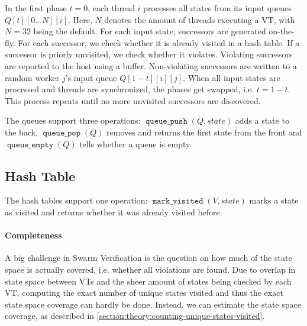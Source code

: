 \documentclass[
fancyheadings, %
%
%
]{stsreprt}
\DeclareMathOperator{\markVisited}{\texttt{mark\_visited}}
\DeclareMathOperator{\qEmpty}{\texttt{queue\_empty}}
\DeclareMathOperator{\qPop}{\texttt{queue\_pop}}
\DeclareMathOperator{\qPush}{\texttt{queue\_push}}
\begin{document}
In the first phase $t=0$, each thread $i$ processes all states from its input queues $Q\left[t\right]\left[ 0 \dots N \right]\left[i\right]$.
Here, $N$ denotes the amount of threads executing a VT, with $N=32$ being the default.
For each input state, successors are generated on-the-fly.
For each successor, we check whether it is already visited in a hash table.
If a successor is priorly unvisited, we check whether it violates.
Violating successors are reported to the host using a buffer.
Non-violating successors are written to a random worker $j$'s input queue $Q\left[1 - t\right]\left[i\right]\left[j\right]$.
When all input states are processed and threads are synchronized, the phases get swapped, i.e. $t = 1 - t$.
This process repeats until no more unvisited successors are discovered.


The queues support three operations: $\qPush(Q, state)$ adds a state to the back, $\qPop(Q)$ removes and returns the first state from the front and $\qEmpty(Q)$ tells whether a queue is empty.

\subsection{Hash Table}
\label{section:theory:hash-table}

The hash tables support one operation: $\markVisited(V, state)$ marks a state as visited and returns whether it was already visited before.





\paragraph{Completeness} A big challenge in Swarm Verification is the question on how much of the state space is actually covered, i.e. whether all violations are found.
Due to overlap in state space between VTs and the sheer amount of states being checked by each VT, computing the exact number of unique states visited and thus the exact state space coverage can hardly be done.
Instead, we can estimate the state space coverage, as described in \cref{section:theory:counting-unique-states-visited}.
\end{document}
